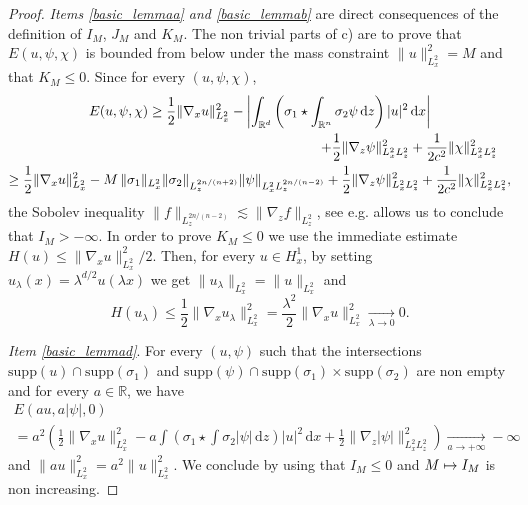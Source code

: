 \documentclass[10pt]{amsart}
\newcommand\mto{\mathchoice{\longmapsto}{\mapsto}{\mapsto}{\mapsto}}
\theoremstyle{definition}
\newcommand{\R}{\mathbb{R}}
\newcommand{\ud}{\, {\mathrm{d}}}
\begin{document}
\begin{proof}
\textit{Items \eqref{basic_lemmaa} and \eqref{basic_lemmab}} are direct consequences of the definition of $I_{M}$, $J_{M}$ and $K_{M}$. The non trivial parts of c) are to prove that $E(u,\psi,\chi)$ is bounded from below under the mass constraint $\|u\|_{L_{x}^{2}}^{2}=M$ and that $K_{M}\leq 0$. Since for every $(u,\psi,\chi)$,\vspace*{-5pt}
\bgroup
{}
\begin{multline}\label{gradient_borne}
E(u,\psi,\chi)\geq\frac{1}{2}\|\nabla_{x}u\|_{L_{x}^{2}}^{2}-\left|\int_{\R^{d}}\left(\sigma_{1}\star\int_{\R^{n}}\sigma_{2}\psi\ud z\right)|u|^{2}\ud x\right| \\
\shoveright{+\frac{1}{2}\|\nabla_{z}\psi\|_{L_{x}^{2}L_{z}^{2}}^{2}+\frac{1}{2c^{2}}\|\chi\|_{L_{x}^{2}L_{z}^{2}}^{2}}\\
\geq\frac{1}{2}\|\nabla_{x}u\|_{L_{x}^{2}}^{2}-M\,\|\sigma_{1}\|_{L_{x}^{2}}\|\sigma_{2}\|_{L_{z}^{2n/(n+2)}}\|\psi\|_{L_{x}^{2}L_{z}^{2n/(n-2)}}
+\frac{1}{2}\|\nabla_{z}\psi\|_{L_{x}^{2}L_{z}^{2}}^{2}+\frac{1}{2c^{2}}\|\chi\|_{L_{x}^{2}L_{z}^{2}}^{2},
\end{multline}
\egroup
the Sobolev inequality $\|f\|_{L_{z}^{2n/(n-2)}}\lesssim\|\nabla_{z}f\|_{L_{z}^{2}}$, see e.g. \cite[Th., p.\,125]{Nir} allows us to conclude that $I_{M}>-\infty$. In order to prove $K_{M}\leq 0$ we use the immediate estimate $H(u)\leq \|\nabla_{x}u\|_{L_{x}^{2}}^{2}/2$. Then, for every $u\in H_{x}^{1}$, by setting $u_{\lambda}(x)=\lambda^{d/2}u(\lambda x)$ we get $\|u_{\lambda}\|_{L_{x}^{2}}=\|u\|_{L_{x}^{2}}$ and
\[
H(u_{\lambda})\leq\frac{1}{2}\|\nabla_{x}u_{\lambda}\|_{L_{x}^{2}}^{2}=\frac{\lambda^{2}}{2}\|\nabla_{x}u\|_{L_{x}^{2}}^{2}\underset{\lambda\to 0}{\to}0.
\]

\textit{Item \eqref{basic_lemmad}}. For every $(u,\psi)$ such that the intersections $\mathrm{supp}(u)\cap\mathrm{supp}(\sigma_{1})$ and $\mathrm{supp}(\psi)\cap\mathrm{supp}(\sigma_{1})\times\mathrm{supp}(\sigma_{2})$ are non empty and for every $a\in\R$, we have
\begin{multline*}
E(au,a|\psi|,0)
\\
= a^{2}\left(\frac{1}{2}\|\nabla_{x}u\|_{L_{x}^{2}}^{2}-a\int\left(\sigma_{1}\star\int\sigma_{2}|\psi|\ud z\right)|u|^{2}\ud x+\frac{1}{2}\|\nabla_{z}|\psi|\|_{L_{x}^{2}L_{z}^{2}}^{2}\right)\underset{a\to+\infty}{\to}-\infty
\end{multline*}
and $\|au\|_{L_{x}^{2}}^{2}=a^{2}\|u\|_{L_{x}^{2}}^{2}$. We conclude by using that $I_{M}\leq 0$ and $M\mto I_{M}$ is non increasing.


\end{proof}
\end{document}
